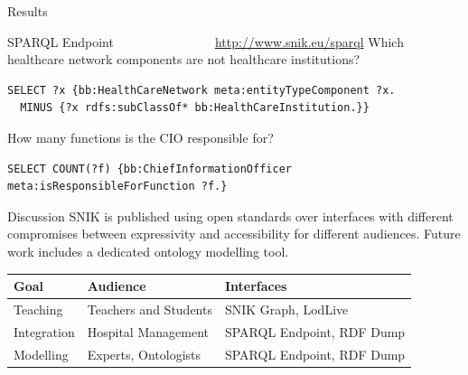 \documentclass[portrait,final,a0paper,fontscale=0.320]{imiseposter}
\begin{document}
\begin{poster}
\begin{posterbox}[name=results,column=1]{Results}
\begin{subsectionbox}{SPARQL Endpoint~~~~~~~~~~~~~~~~\url{http://www.snik.eu/sparql}}
Which healthcare network components are not healthcare institutions?
\begin{lstlisting}
SELECT ?x {bb:HealthCareNetwork meta:entityTypeComponent ?x.
  MINUS {?x rdfs:subClassOf* bb:HealthCareInstitution.}}
\end{lstlisting}
How many functions is the CIO responsible for?
\begin{lstlisting}
SELECT COUNT(?f) {bb:ChiefInformationOfficer meta:isResponsibleForFunction ?f.}
\end{lstlisting}
%
\vspace{-1.0em}
\end{subsectionbox}
\vspace{-0.5em}

\end{posterbox}
\begin{posterbox}[name=discussion,column=1,below=results]{Discussion}
SNIK is published using open standards over interfaces with different compromises between expressivity and accessibility for different audiences.
Future work includes a dedicated ontology modelling tool.
\begin{center}
\begin{tabulary}{\textwidth}{lll}
\toprule
\textbf{Goal}		&\textbf{Audience}		&\textbf{Interfaces}\\
\midrule
Teaching	&Teachers and Students		&SNIK Graph, LodLive\\
Integration	&Hospital Management		&SPARQL Endpoint, RDF Dump\\
Modelling	&Experts, Ontologists		&SPARQL Endpoint, RDF Dump\\
\bottomrule
\end{tabulary}
\end{center}


\end{posterbox}
\end{poster}
\end{document}
